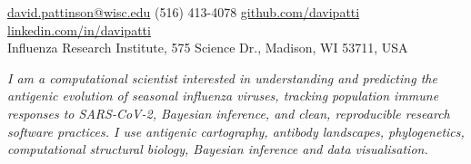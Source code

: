 \documentclass[10pt,a4paper]{article}
\begin{document}
\sloppy  %


\nobreakvspace{0.3em}  %

\noindent\href{mailto:david.pattinson@wisc.edu}{david.pattinson\mbox{}@\mbox{}wisc.edu}\sbull
{} (516) 413-4078\sbull
\href{https://github.com/davipatti}{github.com/davipatti}\sbull
\href{http://linkedin.com/in/davipatti}{linkedin.com/in/davipatti}
\\
Influenza Research Institute, 575 Science Dr., Madison, WI 53711, USA

\spacedhrule{0.9em}{-0.4em}  %



\noindent \emph{I am a computational scientist interested in understanding and
  predicting the antigenic evolution of seasonal influenza viruses, tracking
  population immune responses to SARS-CoV-2, Bayesian inference, and clean,
  reproducible research software practices. I use antigenic cartography,
  antibody landscapes, phylogenetics, computational structural biology, Bayesian
  inference and data visualisation.}



\end{document}
